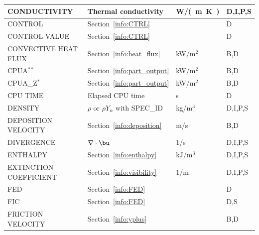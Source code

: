 \documentclass[11pt]{book}
\begin{document}
\begin{longtable}{@{\extracolsep{\fill}}|l|l|l|l|}
{\ct CONDUCTIVITY}                              & Thermal conductivity                          & \si{W/(m.K)}   & D,I,P,S      \\ \hline
{\ct CONTROL}                                   & Section~\ref{info:CTRL}                       &                & D            \\ \hline
{\ct CONTROL VALUE}                             & Section~\ref{info:CTRL}                       &                & D            \\ \hline
{\ct CONVECTIVE HEAT FLUX}                      & Section~\ref{info:heat_flux}                  & kW/m$^2$       & B,D          \\ \hline
{\ct CPUA}$^{**}$                               & Section~\ref{info:part_output}                & kW/m$^2$       & B,D          \\ \hline
{\ct CPUA\_Z}$^{*}$                             & Section~\ref{info:part_output}                & kW/m$^2$       & B,D          \\ \hline
{\ct CPU TIME}                                  & Elapsed CPU time                              & s              & D            \\ \hline
{\ct DENSITY}                                   & $\rho$ or $\rho Y_\alpha$ with {\ct SPEC\_ID} & kg/m$^3$       & D,I,P,S      \\ \hline
{\ct DEPOSITION VELOCITY}                       & Section~\ref{info:deposition}                 & m/s            & B,D          \\ \hline
{\ct DIVERGENCE}                                & $\nabla \cdot \bu$                            & 1/s            & D,I,P,S      \\ \hline
{\ct ENTHALPY}                                  & Section~\ref{info:enthalpy}                   & kJ/m$^3$       & D,I,P,S      \\ \hline
{\ct EXTINCTION COEFFICIENT}                    & Section~\ref{info:visibility}                 & 1/m            & D,I,P,S      \\ \hline
{\ct FED}                                       & Section~\ref{info:FED}                        &                & D            \\ \hline
{\ct FIC}                                       & Section~\ref{info:FED}                        &                & D,S          \\ \hline
{\ct FRICTION VELOCITY}                         & Section~\ref{info:yplus}                      &                & B,D          \\ \hline

\end{longtable}
\end{document}
